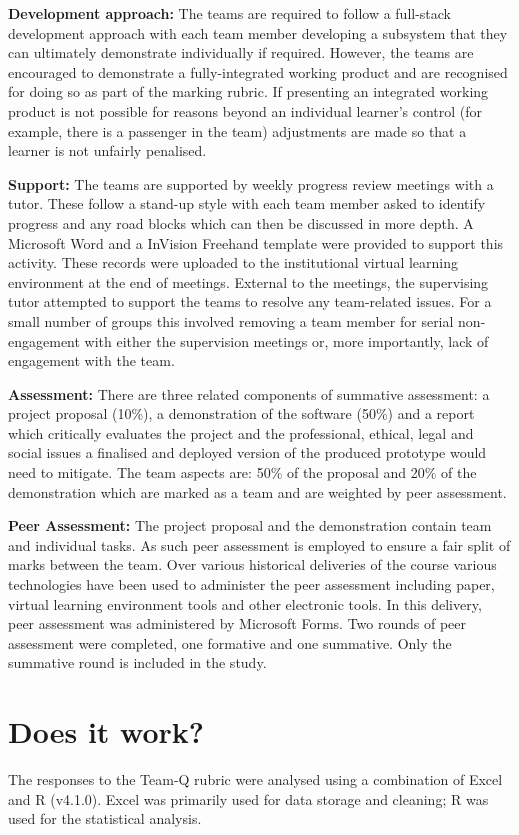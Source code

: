 \documentclass[sigconf, anonymous=false]{acmart}
\begin{document}
\textbf{Development approach:}
The teams are required to follow a full-stack development approach
with each team member developing a subsystem that they can ultimately
demonstrate individually if required. However, the teams are
encouraged to demonstrate a fully-integrated working product and are
recognised for doing so as part of the marking rubric. If presenting
an integrated working product is not possible for reasons beyond an
individual learner's control (for example, there is a passenger in the
team) adjustments are made so that a learner is not unfairly
penalised.

\textbf{Support:}
The teams are supported by weekly progress review meetings with a
tutor. These follow a stand-up style with each team member asked to
identify progress and any road blocks which can then be discussed in
more depth. A Microsoft Word and a InVision Freehand
template were provided to support this activity. These records were
uploaded to the institutional virtual learning environment at the end of
meetings. External to the meetings, the supervising tutor attempted to
support the teams to resolve any team-related issues. For a small
number of groups this involved removing a team member for serial
non-engagement with either the supervision meetings or, more
importantly, lack of engagement with the team.

\textbf{Assessment:}
There are three related components of summative assessment: a project
proposal (10\%), a demonstration of the software (50\%) and a report
which critically evaluates the project and the professional, ethical,
legal and social issues a finalised and deployed version of the
produced prototype would need to mitigate. The team aspects are: 50\%
of the proposal and 20\% of the demonstration which are marked as a
team and are weighted by peer assessment.

\textbf{Peer Assessment:}
The project proposal and the demonstration contain team and individual
tasks. As such peer assessment is employed to ensure a fair split of
marks between the team. Over various historical deliveries of the
course various technologies have been used to administer the peer
assessment including paper, virtual learning environment tools and
other electronic tools. In this delivery, peer assessment was
administered by Microsoft Forms. Two rounds of peer assessment were
completed, one formative and one summative. Only the summative round
is included in the study.

\section{Does it work?}	
The responses to the Team-Q rubric were analysed using a combination
of Excel and R (v4.1.0). Excel was primarily used for data storage
and cleaning; R was used for the statistical analysis.
\end{document}
